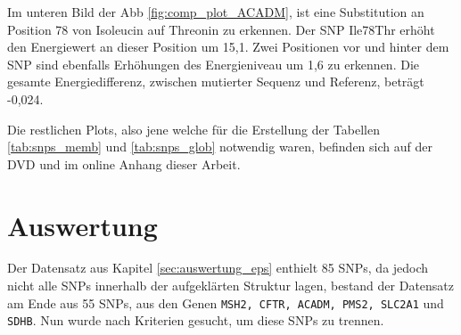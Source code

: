 Im unteren Bild der \ac{Abb} \ref{fig:comp_plot_ACADM}, ist eine Substitution an Position 78 von Isoleucin auf Threonin zu erkennen. Der \ac{SNP} Ile78Thr erhöht den Energiewert an dieser Position um 15,1. Zwei Positionen vor und hinter dem \ac{SNP} sind ebenfalls Erhöhungen des Energieniveau um 1,6 zu erkennen. Die gesamte Energiedifferenz, zwischen mutierter Sequenz und Referenz, beträgt -0,024.

Die restlichen Plots, also jene welche für die Erstellung der Tabellen \ref{tab:snps_memb} und \ref{tab:snps_glob} notwendig waren, befinden sich auf der DVD und im online Anhang dieser Arbeit.




\newpage
\section{Auswertung}
\label{sec:snp_auswertung}
Der Datensatz aus Kapitel \ref{sec:auswertung_eps} enthielt 85 \ac{SNP}s, da jedoch nicht alle SNPs innerhalb der aufgeklärten Struktur lagen, bestand der Datensatz am Ende aus 55 \ac{SNP}s, aus den Genen \texttt{MSH2, CFTR, ACADM, PMS2, SLC2A1} und \texttt{SDHB}. Nun wurde nach Kriterien gesucht, um diese SNPs zu trennen. 


